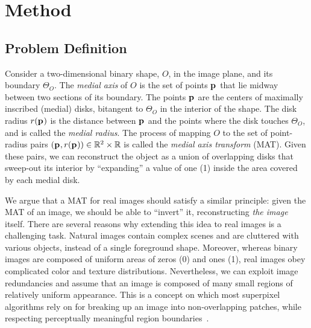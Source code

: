 \documentclass[10pt,twocolumn,letterpaper]{article}
\begin{document}
\section{Method}\label{sec:method}
\subsection{Problem Definition}\label{sec:method:definition}
Consider a two-dimensional binary shape, $O$, in the image plane, and its boundary $\Theta_O$.
The \emph{medial axis} of $O$ is the set of points $\mathbf{p}_{}$ that lie midway between two sections of 
its boundary. The points $\mathbf{p}_{}$ are the centers of maximally inscribed (medial) disks, bitangent to $\Theta_O$
in the interior of the shape. The disk radius $r(\mathbf{p}_{})$ is the distance between $\mathbf{p}_{}$ and 
the points where the disk touches $\Theta_O$, and is called the \emph{medial radius}.
The process of mapping $O$ to the set of point-radius pairs $(\mathbf{p}_{},r(\mathbf{p}_{})) \in \mathbb{R}^2 \times \mathbb{R}$
is called the \emph{medial axis transform} (MAT).
Given these pairs, we can reconstruct the object as a union of overlapping disks that sweep-out 
its interior by ``expanding'' a value of one (1) inside the area covered by each  medial disk.

We argue that a MAT for real images should satisfy a similar principle: given the MAT of an image, 
we should be able to ``invert'' it, reconstructing \emph{the image} itself.
There are several reasons why extending this idea to real images is a challenging task. 
Natural images contain complex scenes and are cluttered with various objects, instead of a single foreground shape.
Moreover, whereas binary images are composed of uniform areas of zeros (0) and ones (1), 
real images obey complicated color and texture distributions.
Nevertheless, we can exploit image redundancies and assume that an image is composed of many small regions of 
relatively uniform appearance.
This is a concept on which most superpixel algorithms rely on for breaking up an image 
into non-overlapping patches, while respecting perceptually meaningful region 
boundaries~\cite{shi2000normalized,levinshtein2009turbopixels,achanta2012slic}. 
\end{document}
